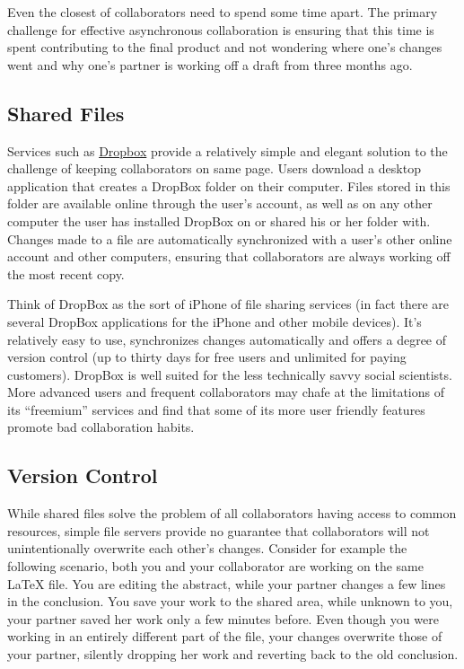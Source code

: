 \documentclass[]{article}
\begin{document}

Even the closest of collaborators need to spend some time apart. The primary
challenge for effective asynchronous collaboration is ensuring that this time 
is spent contributing to the final product and not wondering where one's 
changes went and why one's partner is working off a draft from three months ago.

\subsection{Shared Files}
Services such as \href{http://www.dropbox.com}{Dropbox} provide a relatively 
simple and elegant solution to the challenge of keeping collaborators on same 
page. Users download a desktop application that creates a DropBox folder on
their computer. Files stored in this folder are available online through the 
user's account, as well as on any other computer the user has installed DropBox 
on or shared his or her folder with. Changes made to a file are automatically
synchronized with a user's other online account and other computers, ensuring 
that
collaborators are always working off the most recent copy.

Think of DropBox as the sort of iPhone of file sharing services (in fact there
are several DropBox applications for the iPhone and other mobile devices). It's 
relatively easy to use, synchronizes changes automatically and offers a 
degree 
of version control (up to thirty days for free users and unlimited for paying 
customers). DropBox is well suited for the less technically savvy social 
scientists. More advanced users and frequent collaborators may chafe at the 
limitations of its ``freemium'' services and find that some of its more user
friendly features promote bad collaboration habits.

\subsection{Version Control}
While shared files solve the problem of all collaborators having
access to common resources, simple file servers provide no guarantee that
collaborators will not unintentionally overwrite each other's changes. Consider
for example the following scenario, both you and your collaborator are working
on the same LaTeX file. You are editing the abstract, while your partner
changes a few lines in the conclusion. You save your work to the shared area,
while unknown to you, your partner saved her work only a few minutes before.
Even though you were working in an entirely different part of the file, your
changes overwrite those of your partner, silently dropping her work and
reverting back to the old conclusion. 
\end{document}
